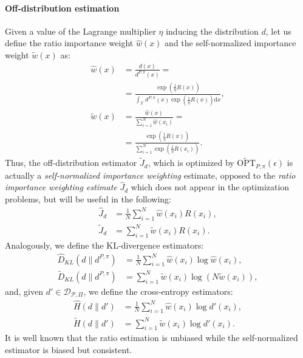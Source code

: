 \paragraph{Off-distribution estimation}
Given a value of the Lagrange multiplier $\eta$ inducing the distribution $d$, let us define the ratio importance weight $\widehat{w}(x)$ and the self-normalized importance weight $\widetilde{w}(x)$ as:
\begin{align*}
	\widehat{w}(x) &= \frac{d(x)}{d^{P,\pi}(x)} =\\ &= \frac{\exp \left( \frac{1}{\eta} R(x) \right)}{\int_{\mathcal{X}} d^{P,\pi}(x) \exp \left( \frac{1}{\eta} R(x) \right) \mathrm{d}x}, \\
	 \widetilde{w}(x) &= \frac{\widehat{w}(x)}{\sum_{i=1}^N \widehat{w}(x_i)} = \\ &= \frac{\exp \left( \frac{1}{\eta} R(x) \right)}{ \sum_{i=1}^N \exp \left( \frac{1}{\eta} R(x_i) \right) }.
\end{align*}
Thus, the off-distribution estimator $\widetilde{J}_d$, which is optimized by $\widetilde{\text{OPT}}_{P,\pi}(\epsilon)$ is actually a \textit{self-normalized importance weighting} estimate, opposed to the \textit{ratio importance weighting estimate} $\widehat{J}_d$ which does not appear in the optimization problems, but will be useful in the following:
\begin{align*}
	\widehat{J}_d &= \frac{1}{N} \sum_{i=1}^N \widehat{w}(x_i) R(x_i), \\ \widetilde{J}_d &= \sum_{i=1}^N \widetilde{w}(x_i) R(x_i).
\end{align*}
Analogously, we define the KL-divergence estimators:
\begin{align*}
	\widehat{D}_{KL}(d \| d^{P,\pi} ) &= \frac{1}{N} \sum_{i=1}^N \widehat{w}(x_i) \log \widehat{w}(x_i), \\ \widetilde{D}_{KL}(d \| d^{P,\pi} ) &= \sum_{i=1}^N  \widetilde{w}(x_i) \log  \left( N \widetilde{w}(x_i)\right),
\end{align*}
and, given $d' \in \mathcal{D}_{\mathcal{P},\Pi}$, we define the cross-entropy estimators:
\begin{align*}
	\widehat{H} (d \| d') &= \frac{1}{N} \sum_{i=1}^N \widehat{w}(x_i) \log d'(x_i), \\ \widetilde{H} (d \| d') &=  \sum_{i=1}^N \widetilde{w}(x_i) \log d'(x_i).
\end{align*}
It is well known that the ratio estimation is unbiased while the self-normalized estimator is biased but consistent.


